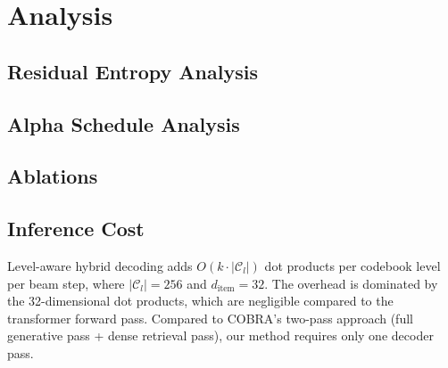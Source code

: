 \section{Analysis}
\label{sec:analysis}

\subsection{Residual Entropy Analysis}


\subsection{Alpha Schedule Analysis}


\subsection{Ablations}


\subsection{Inference Cost}

Level-aware hybrid decoding adds $O(k \cdot |\mathcal{C}_l|)$ dot products per codebook level per beam step, where $|\mathcal{C}_l| = 256$ and $d_\text{item} = 32$. The overhead is dominated by the 32-dimensional dot products, which are negligible compared to the transformer forward pass. Compared to COBRA's two-pass approach (full generative pass + dense retrieval pass), our method requires only one decoder pass.
